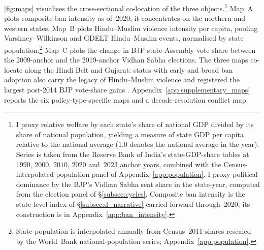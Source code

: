 \autoref{fig:maps} visualises the
cross-sectional co-location of the three objects.\footnote{I proxy relative welfare by each state's share of
national GDP divided by its share of national population, yielding a
measure of state GDP per capita relative to the national average ($1.0$
denotes the national average in the year). Series is taken from the Reserve
Bank of India's state-GDP-share tables at $1990$, $2000$, $2010$, $2020$
and~$2023$ anchor years, combined with the Census-interpolated population
panel of Appendix~\ref{app:population}. I proxy political dominance by the
BJP's Vidhan Sabha seat share in the state-year, computed from the
election panel of \S\ref{subsec:cycles}. Composite ban intensity is the
state-level index of \S\ref{subsec:d_narrative} carried forward
through~$2020$; its construction is in Appendix~\ref{app:ban_intensity}.} Map~A plots composite ban
intensity as of~2020; it concentrates on the northern and western states.
Map~B plots Hindu--Muslim violence intensity per capita, pooling
Varshney--Wilkinson and GDELT Hindu--Muslim events, normalised by state
population.\footnote{State population is interpolated annually from
Census~2011 shares rescaled by the World~Bank national-population series;
Appendix~\ref{app:population}.} Map~C plots the change in BJP state-Assembly
vote share between the 2009-anchor and the 2019-anchor Vidhan Sabha
elections. The three maps co-locate along the Hindi Belt and Gujarat: states
with early and broad ban adoption also carry the legacy of Hindu--Muslim
violence and registered the largest post-2014 BJP vote-share gains \citep*{jhaTradeInstitutionsEthnic2013}. Appendix~\ref{app:supplementary_maps} reports the six policy-type-specific maps and a decade-resolution conflict map.


